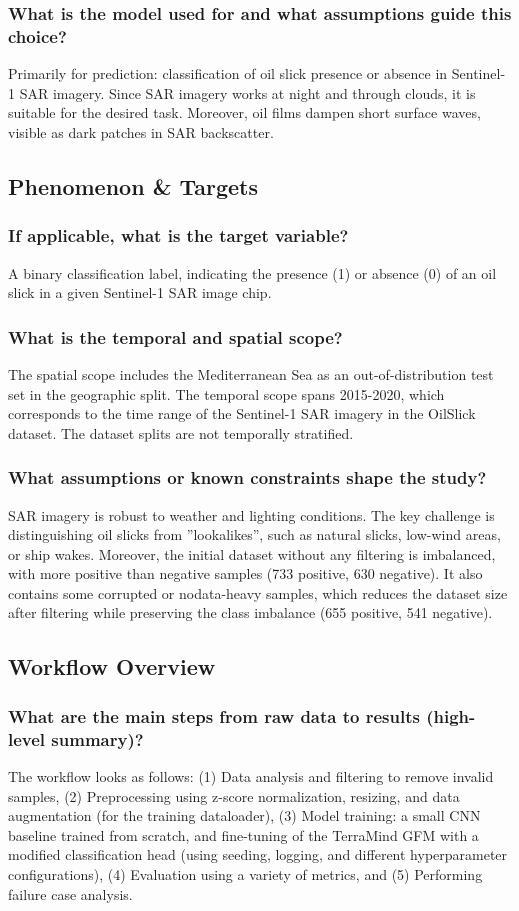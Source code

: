 \documentclass[sigconf]{acmart}
\begin{document}
\subsubsection{What is the model used for and what assumptions guide this choice?} Primarily for prediction: classification of oil slick presence or absence in Sentinel-1 SAR imagery. Since SAR imagery works at night and through clouds, it is suitable for the desired task. Moreover, oil films dampen short surface waves, visible as dark patches in SAR backscatter.

\subsection{Phenomenon \& Targets}
\subsubsection{If applicable, what is the target variable?} A binary classification label, indicating the presence (1) or absence (0) of an oil slick in a given Sentinel-1 SAR image chip.
\subsubsection{What is the temporal and spatial scope?} The spatial scope includes the Mediterranean Sea as an out-of-distribution test set in the geographic split. The temporal scope spans 2015-2020, which corresponds to the time range of the Sentinel-1 SAR imagery in the OilSlick dataset. The dataset splits are not temporally stratified.
\subsubsection{What assumptions or known constraints shape the study?} SAR imagery is robust to weather and lighting conditions. The key challenge is distinguishing oil slicks from ''lookalikes'', such as natural slicks, low-wind areas, or ship wakes. Moreover, the initial dataset without any filtering is imbalanced, with more positive than negative samples (733 positive, 630 negative). It also contains some corrupted or nodata-heavy samples, which reduces the dataset size after filtering while preserving the class imbalance (655 positive, 541 negative).

\subsection{Workflow Overview}
\subsubsection{What are the main steps from raw data to results (high-level summary)?} The workflow looks as follows: (1) Data analysis and filtering to remove invalid samples, (2) Preprocessing using z-score normalization, resizing, and data augmentation (for the training dataloader), (3) Model training: a small CNN baseline trained from scratch, and fine-tuning of the TerraMind GFM with a modified classification head (using seeding, logging, and different hyperparameter configurations), (4) Evaluation using a variety of metrics, and (5) Performing failure case analysis.
\end{document}
